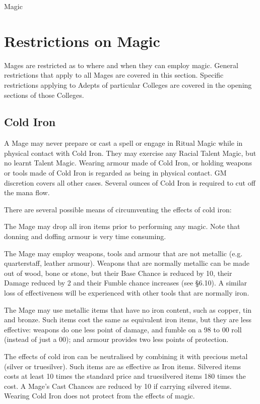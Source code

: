 \begin{Chapter}{Magic}
\section{Restrictions on Magic}

Mages are restricted as to where and when they can employ
magic. General restrictions that apply to all Mages are covered in
this section. Specific restrictions applying to Adepts of particular
Colleges are covered in the opening sections of those Colleges.

\subsection{Cold Iron}

A Mage may never prepare or cast a spell or engage in Ritual Magic
while in physical contact with Cold Iron.  They may exercise any
Racial Talent Magic, but no learnt Talent Magic.  Wearing armour made
of Cold Iron, or holding weapons or tools made of Cold Iron is
regarded as being in physical contact.  GM discretion covers all other
cases.  Several ounces of Cold Iron is required to cut off the mana
flow.

There are several possible means of circumventing the effects of cold
iron:

\begin{Enumerate}

\item The Mage may drop all iron items prior to performing any
  magic. Note that donning and doffing armour is very time consuming.

\item The Mage may employ weapons, tools and armour that are not
  metallic (e.g. quarterstaff, leather armour).  Weapons that are
  normally metallic can be made out of wood, bone or stone, but their
  Base Chance is reduced by 10, their Damage reduced by 2 and their
  Fumble chance increases (see §6.10). A similar loss of effectiveness
  will be experienced with other tools that are normally iron.

\item The Mage may use metallic items that have no iron content, such
  as copper, tin and bronze.  Such items cost the same as equivalent
  iron items, but they are less effective: weapons do one less point
  of damage, and fumble on a 98 to 00 roll (instead of just a 00); and
  armour provides two less points of protection.

\item The effects of cold iron can be neutralised by combining it with
  precious metal (silver or truesilver).  Such items are as effective
  as Iron items.  Silvered items costs at least 10 times the standard
  price and truesilvered items 180 times the cost.  A Mage’s Cast
  Chances are reduced by 10 if carrying silvered items. Wearing Cold
  Iron does not protect from the effects of magic.


\end{Enumerate}
\end{Chapter}
